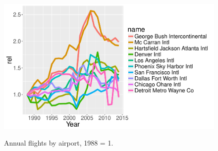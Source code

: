\documentclass{scrreprt}\usepackage[]{graphicx}\usepackage[]{color}
\newlength\figurewidth
\begin{document}
\begin{figure}
{\includegraphics[width=\figurewidth]{figure/Relative-volume-by-major-airports-1}}
\caption{Annual flights by airport, 1988 = 1.}
\end{figure}
\end{document}
